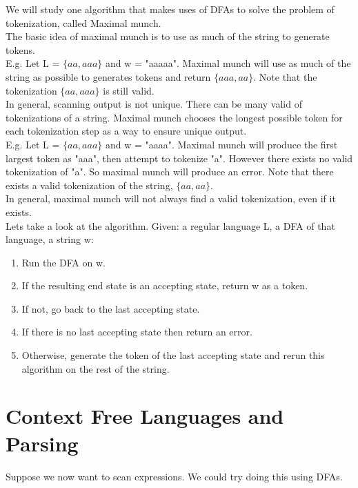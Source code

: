 \documentclass[12pt, letterpaper]{article}
\begin{document}
We will study one algorithm that makes uses of DFAs to solve the problem of tokenization, called Maximal munch.\\

The basic idea of maximal munch is to use as much of the string to generate tokens.\\

E.g. Let L = \(\{aa, aaa\}\) and w = "aaaaa". Maximal munch will use as much of the string as possible to generates tokens and return \(\{aaa, aa\}\). Note that the tokenization \(\{aa, aaa\}\) is still valid.\\

In general, scanning output is not unique. There can be many valid of tokenizations of a string. Maximal munch chooses the longest possible token for each tokenization step as a way to ensure unique output.\\

E.g. Let L = \(\{aa, aaa\}\) and w = "aaaa". Maximal munch will produce the first largest token as "aaa", then attempt to tokenize "a". However there exists no valid tokenization of "a". So maximal munch will produce an error. Note that there exists a valid tokenization of the string, \(\{aa, aa\}\).\\

In general, maximal munch will not always find a valid tokenization, even if it exists.\\

Lets take a look at the algorithm. Given: a regular language L, a DFA of that language, a string w:
\begin{enumerate}
\item Run the DFA on w.
\item If the resulting end state is an accepting state, return w as a token.
\item If not, go back to the last accepting state.
\item If there is no last accepting state then return an error.
\item Otherwise, generate the token of the last accepting state and rerun this algorithm on the rest of the string.
\end{enumerate}

\newpage

\section{Context Free Languages and Parsing}
Suppose we now want to scan expressions. We could try doing this using DFAs. \\
\end{document}
